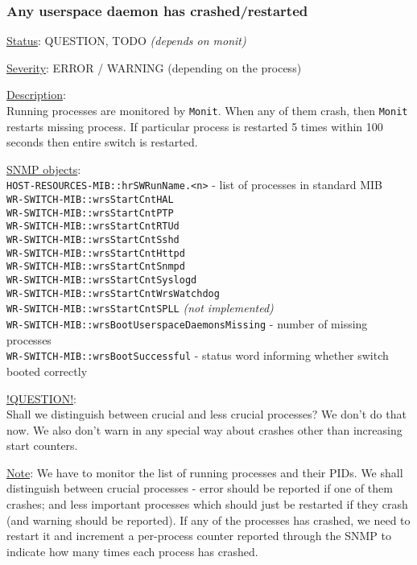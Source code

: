 \subsubsection{\bf Any userspace daemon has crashed/restarted}
		\label{fail:other:daemon_crash}
		\begin{packed_enum}
			\item [] \underline{Status}: QUESTION, TODO \emph{(depends on monit)}
			\item [] \underline{Severity}: ERROR / WARNING (depending on the process)
			\item [] \underline{Description}:\\
				Running processes are monitored by \texttt{Monit}. When any of them crash,
				then \texttt{Monit} restarts missing process. If particular process is restarted
				5 times within 100 seconds then entire switch is restarted.
			\item [] \underline{SNMP objects}:\\
				\texttt{HOST-RESOURCES-MIB::hrSWRunName.<n>} - list of processes in standard MIB\\
				\texttt{WR-SWITCH-MIB::wrsStartCntHAL}\\
				\texttt{WR-SWITCH-MIB::wrsStartCntPTP}\\
				\texttt{WR-SWITCH-MIB::wrsStartCntRTUd}\\
				\texttt{WR-SWITCH-MIB::wrsStartCntSshd}\\
				\texttt{WR-SWITCH-MIB::wrsStartCntHttpd}\\
				\texttt{WR-SWITCH-MIB::wrsStartCntSnmpd}\\
				\texttt{WR-SWITCH-MIB::wrsStartCntSyslogd}\\
				\texttt{WR-SWITCH-MIB::wrsStartCntWrsWatchdog}\\
				\texttt{WR-SWITCH-MIB::wrsStartCntSPLL} \emph{(not implemented)}\\
				\texttt{WR-SWITCH-MIB::wrsBootUserspaceDaemonsMissing} - number of missing processes\\
				\texttt{WR-SWITCH-MIB::wrsBootSuccessful} - status word informing whether switch booted correctly
			\item [] \underline{!QUESTION!}: \\
				Shall we distinguish between crucial and less crucial processes? We don't do that now.
				We also don't warn in any special way about crashes other than increasing start counters.
			\item [] \underline{Note}: We have to monitor the list of running
				processes and their PIDs. We shall distinguish between crucial
				processes - error should be reported if one of them crashes; and less
				important processes which should just be restarted if they crash (and
				warning should be reported). If any of the processes has crashed, we
				need to restart it and increment a per-process counter reported through
				the SNMP to indicate how many times each process has crashed.\\


\end{packed_enum}
